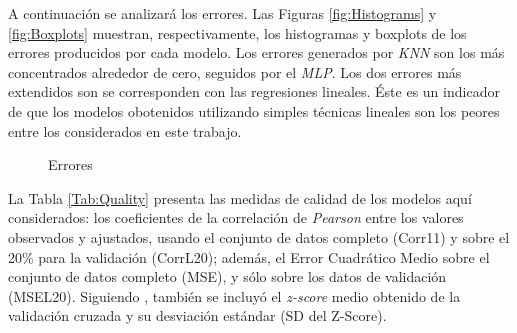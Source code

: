     \par A continuación se analizará los errores. Las Figuras \ref{fig:Histograms}
    y \ref{fig:Boxplots} muestran, respectivamente, los histogramas y boxplots
    de los errores producidos por cada modelo. Los errores generados por
    \textit{KNN} son los más concentrados alrededor de cero, seguidos por el
    \textit{MLP}. Los dos errores más extendidos son se corresponden con
    las regresiones lineales. Éste es un indicador de que los modelos
    obotenidos utilizando simples técnicas lineales son los peores entre los
    considerados en este trabajo.
      \begin{figure}
      \centering
      \caption{Errores}\label{fig:Residuals}
      \end{figure}


  \par La Tabla \ref{Tab:Quality} presenta las medidas de calidad de los modelos
  aquí considerados: los coeficientes de la correlación de \textit{Pearson}
  entre los valores observados y ajustados, usando el conjunto de datos
  completo (Corr11) y sobre el 20\% para la validación (CorrL20); además,
  el Error Cuadrático Medio sobre el conjunto de datos completo (MSE), y
  sólo sobre los datos de validación (MSEL20). Siguiendo \cite{dynamics_of_dengue},
  también se incluyó el \textit{z-score} medio obtenido de la validación
  cruzada y su desviación estándar (SD del Z-Score).


